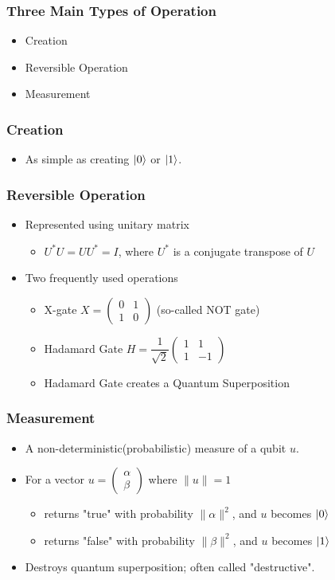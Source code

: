\documentclass{beamer}
\begin{document}
	\begin{frame}
		\frametitle{Three Main Types of Operation}
		\begin{itemize}
			\item Creation
			\item Reversible Operation
			\item Measurement
		\end{itemize}
	\end{frame}
	
	\begin{frame}
		\frametitle{Creation}
		\begin{itemize}
			\item As simple as creating $\ket{0}$ or $\ket{1}$.
		\end{itemize}
	\end{frame}
	
	\begin{frame}
		\frametitle{Reversible Operation}
		\begin{itemize}
			\item Represented using unitary matrix
			\begin{itemize}
				\item $U^*U=UU^*=I$, where $U^*$ is a conjugate transpose of $U$
			\end{itemize}
			\item Two frequently used operations
			\begin{itemize}
				\item X-gate $X=\begin{pmatrix} 0 & 1 \\ 1 & 0 \end{pmatrix}$ (so-called NOT gate)
				\item Hadamard Gate $H=\dfrac{1}{\sqrt{2}}\begin{pmatrix} 1 & 1 \\ 1 & -1 \end{pmatrix}$
				\item Hadamard Gate creates a Quantum Superposition
			\end{itemize}
		\end{itemize}
	\end{frame}
	
	\begin{frame}
		\frametitle{Measurement}
		\begin{itemize}
			\item A non-deterministic(probabilistic) measure of a qubit $u$.
			\item For a vector $u=\begin{pmatrix} \alpha \\ \beta \end{pmatrix}$ where $\|u\|=1$
			\begin{itemize}
				\item returns "true" with probability $\|\alpha\|^2$, and $u$ becomes $\ket{0}$
				\item returns "false" with probability $\|\beta\|^2$, and $u$ becomes $\ket{1}$
			\end{itemize}
			\item Destroys quantum superposition; often called "destructive".
		\end{itemize}
	\end{frame}
	
\end{document}
